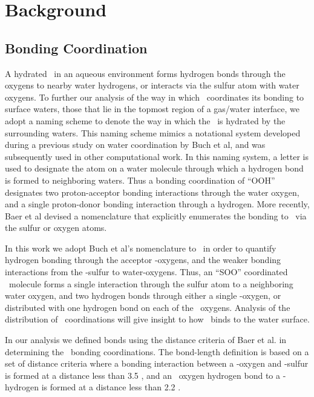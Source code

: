 \section {Background}

\subsection {Bonding Coordination}

A hydrated \suldiox~in an aqueous environment forms hydrogen bonds through the oxygens to nearby water hydrogens, or interacts via the sulfur atom with water oxygens. To further our analysis of the way in which \suldiox~coordinates its bonding to surface waters, those that lie in the topmost region of a gas/water interface, we adopt a naming scheme to denote the way in which the \suldiox~is hydrated by the surrounding waters. This naming scheme mimics a notational system developed during a previous study on water coordination by Buch et al,\cite{Buch 2005} and was subsequently used in other computational work.\cite{Walker2006b} In this naming system, a letter is used to designate the atom on a water molecule through which a hydrogen bond is formed to neighboring waters. Thus a bonding coordination of ``OOH'' designates two proton-acceptor bonding interactions through the water oxygen, and a single proton-donor bonding interaction through a hydrogen. More recently, Baer et al devised a nomenclature that explicitly enumerates the bonding to \suldiox~via the sulfur or oxygen atoms.\cite{Baer2010} 

In this work we adopt Buch et al's nomenclature to \suldiox~in order to quantify hydrogen bonding through the acceptor \suldiox-oxygens, and the weaker bonding interactions from the \suldiox-sulfur to water-oxygens. Thus, an ``SOO'' coordinated \suldiox~molecule forms a single interaction through the sulfur atom to a neighboring water oxygen, and two hydrogen bonds through either a single \suldiox-oxygen, or distributed with one hydrogen bond on each of the \suldiox~oxygens. Analysis of the distribution of \suldiox~coordinations will give insight to how \suldiox~binds to the water surface.

In our analysis we defined bonds using the distance criteria of Baer et al. in determining the \suldiox~bonding coordinations.\cite{Baer2010} The bond-length definition is based on a set of distance criteria where a bonding interaction between a \wat-oxygen and \suldiox-sulfur is formed at a distance less than 3.5 \angs, and an \suldiox~oxygen hydrogen bond to a \wat-hydrogen is formed at a distance less than 2.2 \angs.

